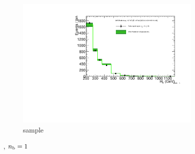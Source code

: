 \begin{figure}[h!]
\begin{subfigure}[b]{0.48\textwidth}
    \includegraphics[width=\textwidth,page=6]
    {Figs/results/v0/greenBand/bestFit_2012dev_RQcdZero_fZinvAll_1b_le3j-12p_smOnly}
    \caption{\gj sample}
  \end{subfigure}
  \caption{\njlow, $n_{\text{b}} = 1$}
  \label{fig:green_fits_1b_le3j}
\end{figure}

